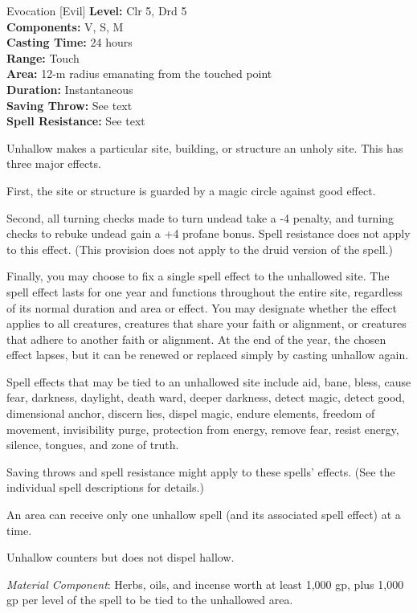 {Evocation [Evil]}
{
	\textbf{Level:}
	Clr 5, Drd 5\\
	\textbf{Components:}
	V, S, M\\
	\textbf{Casting Time:}
	24 hours\\
	\textbf{Range:}
	Touch\\
	\textbf{Area:}
	12-m radius emanating from the touched point\\
	\textbf{Duration:}
	Instantaneous\\
	\textbf{Saving Throw:}
	See text\\
	\textbf{Spell Resistance:}
	See text\\
}
{
	Unhallow makes a particular site, building, or structure an unholy site. This has three major effects.

	First, the site or structure is guarded by a magic circle against good effect.

	Second, all turning checks made to turn undead take a -4 penalty, and turning checks to rebuke undead gain a +4 profane bonus. Spell resistance does not apply to this effect. (This provision does not apply to the druid version of the spell.)

	Finally, you may choose to fix a single spell effect to the unhallowed site. The spell effect lasts for one year and functions throughout the entire site, regardless of its normal duration and area or effect. You may designate whether the effect applies to all creatures, creatures that share your faith or alignment, or creatures that adhere to another faith or alignment. At the end of the year, the chosen effect lapses, but it can be renewed or replaced simply by casting unhallow again.

	Spell effects that may be tied to an unhallowed site include aid, bane, bless, cause fear, darkness, daylight, death ward, deeper darkness, detect magic, detect good, dimensional anchor, discern lies, dispel magic, endure elements, freedom of movement, invisibility purge, protection from energy, remove fear, resist energy, silence, tongues, and zone of truth.

Saving throws and spell resistance might apply to these spells' effects. (See the individual spell descriptions for details.)

	An area can receive only one unhallow spell (and its associated spell effect) at a time.

	Unhallow counters but does not dispel hallow.

	\textit{Material Component}:
	Herbs, oils, and incense worth at least 1,000 gp, plus 1,000 gp per level of the spell to be tied to the unhallowed area.

}
